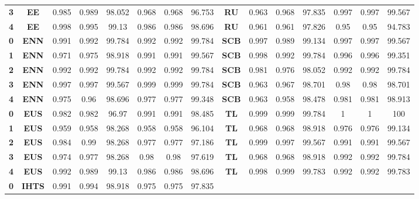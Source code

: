 {{\begin{tabular}{c|c|cccccc|ccccccc}
\textbf{3} & \textbf{EE} & 0.985 & 0.989 & 98.052 & 0.968 & 0.968 & 96.753 & \multicolumn{1}{c|}{\textbf{RU}} & 0.963 & 0.968 & 97.835 & 0.997 & 0.997 & 99.567 \\
\textbf{4} & \textbf{EE} & 0.998 & 0.995 & 99.13 & 0.986 & 0.986 & 98.696 & \multicolumn{1}{c|}{\textbf{RU}} & 0.961 & 0.961 & 97.826 & 0.95  & 0.95  & 94.783 \\
\textbf{0} & \textbf{ENN} & 0.991 & 0.992 & 99.784 & 0.992 & 0.992 & 99.784 & \multicolumn{1}{c|}{\textbf{SCB}} & 0.997 & 0.989 & 99.134 & 0.997 & 0.997 & 99.567 \\
\textbf{1} & \textbf{ENN} & 0.971 & 0.975 & 98.918 & 0.991 & 0.991 & 99.567 & \multicolumn{1}{c|}{\textbf{SCB}} & 0.998 & 0.992 & 99.784 & 0.996 & 0.996 & 99.351 \\
\textbf{2} & \textbf{ENN} & 0.992 & 0.992 & 99.784 & 0.992 & 0.992 & 99.784 & \multicolumn{1}{c|}{\textbf{SCB}} & 0.981 & 0.976 & 98.052 & 0.992 & 0.992 & 99.784 \\
\textbf{3} & \textbf{ENN} & 0.997 & 0.997 & 99.567 & 0.999 & 0.999 & 99.784 & \multicolumn{1}{c|}{\textbf{SCB}} & 0.963 & 0.967 & 98.701 & 0.98  & 0.98  & 98.701 \\
\textbf{4} & \textbf{ENN} & 0.975 & 0.96  & 98.696 & 0.977 & 0.977 & 99.348 & \multicolumn{1}{c|}{\textbf{SCB}} & 0.963 & 0.958 & 98.478 & 0.981 & 0.981 & 98.913 \\
\textbf{0} & \textbf{EUS} & 0.982 & 0.982 & 96.97 & 0.991 & 0.991 & 98.485 & \multicolumn{1}{c|}{\textbf{TL}} & 0.999 & 0.999 & 99.784 & 1     & 1     & 100 \\
\textbf{1} & \textbf{EUS} & 0.959 & 0.958 & 98.268 & 0.958 & 0.958 & 96.104 & \multicolumn{1}{c|}{\textbf{TL}} & 0.968 & 0.968 & 98.918 & 0.976 & 0.976 & 99.134 \\
\textbf{2} & \textbf{EUS} & 0.984 & 0.99  & 98.268 & 0.977 & 0.977 & 97.186 & \multicolumn{1}{c|}{\textbf{TL}} & 0.999 & 0.997 & 99.567 & 0.991 & 0.991 & 99.567 \\
\textbf{3} & \textbf{EUS} & 0.974 & 0.977 & 98.268 & 0.98  & 0.98  & 97.619 & \multicolumn{1}{c|}{\textbf{TL}} & 0.968 & 0.968 & 98.918 & 0.992 & 0.992 & 99.784 \\
\textbf{4} & \textbf{EUS} & 0.992 & 0.989 & 99.13 & 0.986 & 0.986 & 98.696 & \multicolumn{1}{c|}{\textbf{TL}} & 0.998 & 0.999 & 99.783 & 0.992 & 0.992 & 99.783 \\
\textbf{0} & \textbf{IHTS} & 0.991 & 0.994 & 98.918 & 0.975 & 0.975 & 97.835 &       &       &       &       &       &       &  \\

\end{tabular}}}
